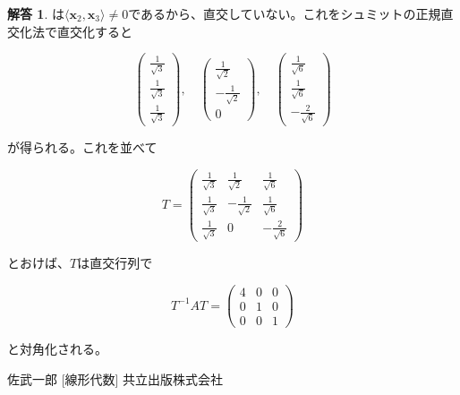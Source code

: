 \documentclass[dvipdfmx,autodetect-engine]{jsarticle}
\theoremstyle{definition}
\newtheorem*{Answer*}{解答}
\begin{document}
{\begin{Answer*}
は$\langle \bm{x}_2, \bm{x}_3 \rangle \neq 0$であるから、直交していない。これをシュミットの正規直交化法で直交化すると

$$
\begin{pmatrix}
\frac{1}{\sqrt{3}} \\[1.5ex]
\frac{1}{\sqrt{3}} \\[1.5ex]
\frac{1}{\sqrt{3}}
\end{pmatrix}, \quad \begin{pmatrix}
\frac{1}{\sqrt{2}} \\[1.5ex]
-\frac{1}{\sqrt{2}} \\[1.5ex]
0
\end{pmatrix}, \quad \begin{pmatrix}
\frac{1}{\sqrt{6}} \\[1.5ex]
\frac{1}{\sqrt{6}} \\[1.5ex]
- \frac{2}{\sqrt{6}}
\end{pmatrix}
$$

が得られる。これを並べて

$$
T = \begin{pmatrix}
\frac{1}{\sqrt{3}} & \frac{1}{\sqrt{2}} & \frac{1}{\sqrt{6}} \\[1.5ex]
\frac{1}{\sqrt{3}} & - \frac{1}{\sqrt{2}} & \frac{1}{\sqrt{6}} \\[1.5ex]
\frac{1}{\sqrt{3}} & 0 & - \frac{2}{\sqrt{6}}
\end{pmatrix}
$$

とおけば、$T$は直交行列で

$$
T^{-1}AT = \begin{pmatrix}
4 & 0 & 0 \\
0 & 1 & 0 \\
0 & 0 & 1
\end{pmatrix}
$$

と対角化される。

\end{Answer*}
}


\begin{thebibliography}{n}
 佐武一郎 [線形代数] 共立出版株式会社
\end{thebibliography}
\end{document}
